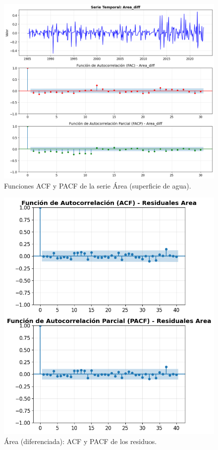 \begin{figure}[H]
    \centering
    \includegraphics[scale=.42]{Figures/facp_Area_dif.png}
    \caption{Funciones ACF y PACF de la serie Área (superficie de agua).}
    \label{fig:facp_area_dif}
\end{figure}

\begin{figure}[H]\centering
\includegraphics[scale=.52]{Figures/acf_pacf_res_area_d.png}
\caption{Área (diferenciada): ACF y PACF de los residuos.}
\label{fig:acf_pacf_res_area_d}
\end{figure}

